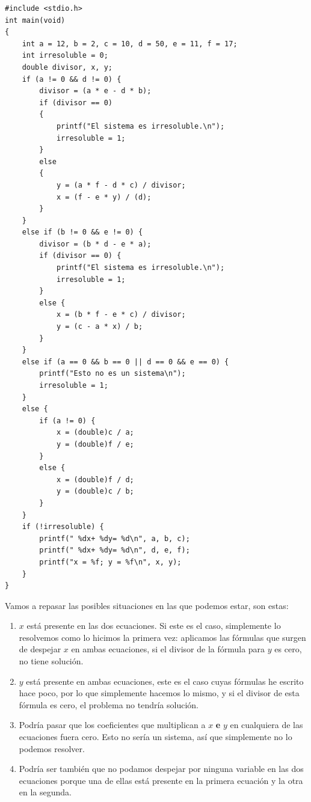 \documentclass[a4paper]{article}
\begin{document}
\begin{lstlisting}[style=C,
caption={Programa de resolución de ecuaciones lineales con condicionales},
label={lst:linealSystemFinal}]
#include <stdio.h>
int main(void)
{
    int a = 12, b = 2, c = 10, d = 50, e = 11, f = 17;
    int irresoluble = 0;
    double divisor, x, y;
    if (a != 0 && d != 0) {
        divisor = (a * e - d * b);
        if (divisor == 0)
        {
            printf("El sistema es irresoluble.\n");
            irresoluble = 1;
        }
        else
        {
            y = (a * f - d * c) / divisor;
            x = (f - e * y) / (d);
        }
    }
    else if (b != 0 && e != 0) {
        divisor = (b * d - e * a);
        if (divisor == 0) {
            printf("El sistema es irresoluble.\n");
            irresoluble = 1;
        }
        else {
            x = (b * f - e * c) / divisor;
            y = (c - a * x) / b;
        }
    }
    else if (a == 0 && b == 0 || d == 0 && e == 0) {
        printf("Esto no es un sistema\n");
        irresoluble = 1;
    }
    else {
        if (a != 0) {
            x = (double)c / a;
            y = (double)f / e;
        }
        else {
            x = (double)f / d;
            y = (double)c / b;
        }
    }
    if (!irresoluble) {
        printf(" %dx+ %dy= %d\n", a, b, c);
        printf(" %dx+ %dy= %d\n", d, e, f);
        printf("x = %f; y = %f\n", x, y);
    }
}
\end{lstlisting}

Vamos a repasar las posibles situaciones en las que podemos estar, son estas:
\begin{enumerate}
\item $x$ está presente en las dos ecuaciones. Si este es el caso, simplemente
lo resolvemos como lo hicimos la primera vez: aplicamos las fórmulas que surgen
de despejar $x$ en ambas ecuaciones, si el divisor de la fórmula para $y$ es
cero, no tiene solución.
\item $y$ está presente en ambas ecuaciones, este es el caso cuyas fórmulas
he escrito hace poco, por lo que simplemente hacemos lo mismo, y si el divisor
de esta fórmula es cero, el problema no tendría solución.
\item Podría pasar que los coeficientes que multiplican a $x$ \textbf{e} $y$
en cualquiera de las ecuaciones fuera cero. Esto no sería un sistema, así
que simplemente no lo podemos resolver.
\item Podría ser también que no podamos despejar por ninguna variable en las
dos ecuaciones porque una de ellas está presente en la primera ecuación y la
otra en la segunda.
\end{enumerate}
\end{document}
